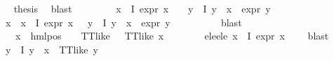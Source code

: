 \begin{isabellebody}
\ \isamarkupfalse%
\ {\isacharquery}{\kern0pt}thesis\ \isamarkupfalse%
\ blast\isanewline
\ \ \isamarkupfalse%
\isanewline
\ \ \ \ \isamarkupfalse%
\ {\isachardoublequoteopen}{\isasymexists}x{\isasymin}{\isasymPhi}\ {\isacharbackquote}{\kern0pt}\ I{\isachardot}{\kern0pt}\ expr{\isacharunderscore}{\kern0pt}{}\ x\ {\isasymle}\ {}\ {\isasymand}\ {\isacharparenleft}{\kern0pt}{\isasymforall}y{\isasymin}{\isasymPhi}\ {\isacharbackquote}{\kern0pt}\ I{\isachardot}{\kern0pt}\ y\ {\isasymnoteq}\ x\ {\isasymlongrightarrow}\ expr{\isacharunderscore}{\kern0pt}{}\ y\ {\isasymle}\ {}{\isacharparenright}{\kern0pt}{\isachardoublequoteclose}\isanewline
\ \ \ \ \isamarkupfalse%
\ \isamarkupfalse%
\ x\ \ {\isachardoublequoteopen}x{\isasymin}{\isasymPhi}\ {\isacharbackquote}{\kern0pt}\ I{\isachardoublequoteclose}\ {\isachardoublequoteopen}expr{\isacharunderscore}{\kern0pt}{}\ x\ {\isasymle}\ {}{\isachardoublequoteclose}\ {\isachardoublequoteopen}{\isacharparenleft}{\kern0pt}{\isasymforall}y{\isasymin}{\isasymPhi}\ {\isacharbackquote}{\kern0pt}\ I{\isachardot}{\kern0pt}\ y\ {\isasymnoteq}\ x\ {\isasymlongrightarrow}\ expr{\isacharunderscore}{\kern0pt}{}\ y\ {\isasymle}\ {}{\isacharparenright}{\kern0pt}{\isachardoublequoteclose}\isanewline
\ \ \ \ \ \ \isamarkupfalse%
\ blast\isanewline
\ \ \ \ \isamarkupfalse%
\ {\isachardoublequoteopen}{\isacharparenleft}{\kern0pt}{\isasymexists}{\isasymalpha}\ {\isasymchi}{\isachardot}{\kern0pt}\ x\ {\isacharequal}{\kern0pt}\ hml{\isacharunderscore}{\kern0pt}pos\ {\isasymalpha}\ {\isasymchi}\ {\isasymand}\ TT{\isacharunderscore}{\kern0pt}like\ {\isasymchi}{\isacharparenright}{\kern0pt}\ {\isasymor}\ TT{\isacharunderscore}{\kern0pt}like\ x{\isachardoublequoteclose}\isanewline
\ \ \ \ \ \ \isamarkupfalse%
\ e{}{\isacharunderscore}{\kern0pt}le{\isacharunderscore}{\kern0pt}{}{\isacharunderscore}{\kern0pt}e{}{\isacharunderscore}{\kern0pt}le{\isacharunderscore}{\kern0pt}{}\ {\isacartoucheopen}{\isasymforall}x{\isasymin}{\isasymPhi}\ {\isacharbackquote}{\kern0pt}\ I{\isachardot}{\kern0pt}\ expr{\isacharunderscore}{\kern0pt}{}\ x\ {\isasymle}\ {}{\isacartoucheclose}\ \isamarkupfalse%
\ blast\isanewline
\ \ \ \ \isamarkupfalse%
\ {\isachardoublequoteopen}{\isacharparenleft}{\kern0pt}{\isasymforall}y{\isasymin}{\isasymPhi}\ {\isacharbackquote}{\kern0pt}\ I{\isachardot}{\kern0pt}\ y\ {\isasymnoteq}\ x\ {\isasymlongrightarrow}\ TT{\isacharunderscore}{\kern0pt}like\ y{\isacharparenright}{\kern0pt}{\isachardoublequoteclose}\isanewline

\end{isabellebody}
